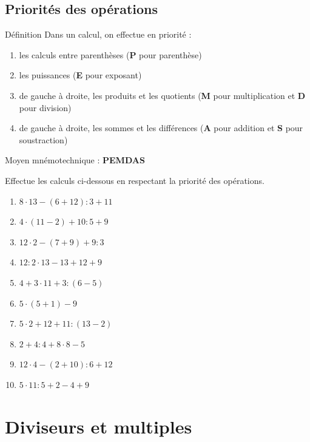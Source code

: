 \documentclass[10pt,a4paper]{article}
\begin{document}
	\subsection{Priorités des opérations}
		\begin{bclogo}[arrondi=0.3, logo=\bccle]{Définition}
			Dans un calcul, on effectue en priorité :
			\begin{enumerate}
				\item les calculs entre parenthèses (\textbf{P} pour parenthèse)
				\item les puissances (\textbf{E} pour exposant)
				\item de gauche à droite, les produits et les quotients (\textbf{M} pour multiplication et \textbf{D} pour division)
				\item de gauche à droite, les sommes et les différences (\textbf{A} pour addition et \textbf{S} pour soustraction)
			\end{enumerate}
			Moyen mnémotechnique : \textbf{PEMDAS}	
		\end{bclogo}

\pagebreak
\begin{exercise}
	Effectue les calculs ci-dessous en respectant la priorité des opérations.
			\begin{enumerate}[cols=2]
				\item $8\cdot 13-(6+12):3+11$
				\item $4\cdot (11-2)+10:5+9$
				\item $12\cdot 2-(7+9)+9:3$
				\item $12:2\cdot 13-13+12+9$
				\item $4+3\cdot 11+3:(6-5)$
				\item $5\cdot (5+1)-9$
				\item $5\cdot 2+12+11:(13-2)$
				\item $2+4:4+8\cdot 8-5$
				\item $12\cdot 4-(2+10):6+12$
				\item $5\cdot 11:5+2-4+9$
			\end{enumerate}
\end{exercise}

\section{Diviseurs et multiples}
\end{document}
